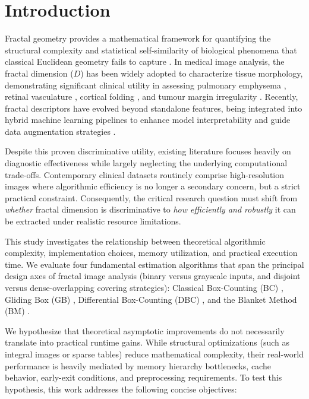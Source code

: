 \section{Introduction}

Fractal geometry provides a mathematical framework for quantifying the structural complexity and statistical self-similarity of biological phenomena that classical Euclidean geometry fails to capture \cite{Mandelbrot1982}. In medical image analysis, the fractal dimension ($D$) has been widely adopted to characterize tissue morphology, demonstrating significant clinical utility in assessing pulmonary emphysema \cite{Mishima1999}, retinal vasculature \cite{Jelinek2000}, cortical folding \cite{Free1996}, and tumour margin irregularity \cite{Rangayyan2007}. Recently, fractal descriptors have evolved beyond standalone features, being integrated into hybrid machine learning pipelines to enhance model interpretability \cite{roberto2021fractal} and guide data augmentation strategies \cite{borgue2025association, Lopes2011}.

Despite this proven discriminative utility, existing literature focuses heavily on diagnostic effectiveness while largely neglecting the underlying computational trade-offs. Contemporary clinical datasets routinely comprise high-resolution images where algorithmic efficiency is no longer a secondary concern, but a strict practical constraint. Consequently, the critical research question must shift from \textit{whether} fractal dimension is discriminative to \textit{how efficiently and robustly} it can be extracted under realistic resource limitations.

This study investigates the relationship between theoretical algorithmic complexity, implementation choices, memory utilization, and practical execution time. We evaluate four fundamental estimation algorithms that span the principal design axes of fractal image analysis (binary versus grayscale inputs, and disjoint versus dense-overlapping covering strategies): Classical Box-Counting (BC) \cite{Mandelbrot1982}, Gliding Box (GB) \cite{Allain1991}, Differential Box-Counting (DBC) \cite{Sarkar1994}, and the Blanket Method (BM) \cite{Peleg1984}. 

We hypothesize that theoretical asymptotic improvements do not necessarily translate into practical runtime gains. While structural optimizations (such as integral images or sparse tables) reduce mathematical complexity, their real-world performance is heavily mediated by memory hierarchy bottlenecks, cache behavior, early-exit conditions, and preprocessing requirements. To test this hypothesis, this work addresses the following concise objectives:

